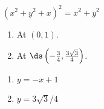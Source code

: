 {$(x^2+y^2+x)^2 = x^2+y^2$
\begin{enumerate}
\item	At $(0,1)$.
\item	At $\ds \left(-\frac34, \frac{3 \sqrt{3}}{4}\right)$.
\end{enumerate}
}
{\begin{enumerate}
\item	$y=-x+1$
\item	$y = 3\sqrt{3}/4$
\end{enumerate}
}
